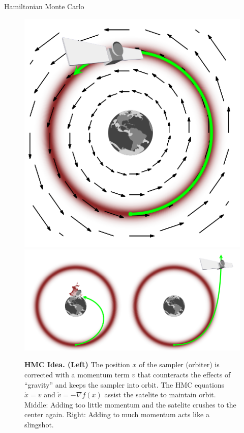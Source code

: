 \documentclass[10pt]{beamer}
\begin{document}
\begin{frame}[allowframebreaks]{Hamiltonian Monte Carlo}
    \begin{figure}
        \centering
        \includegraphics[height=0.4\textheight]{publications/presentations/log_concave_sampling/hmc.png} \quad
        \includegraphics[height=0.4\textheight]{publications/presentations/log_concave_sampling/bad_trajectories.png}
        \caption{\textbf{HMC Idea. (Left)} The position $x$ of the sampler (orbiter) is corrected with a momentum term $v$ that counteracts the effects of ``gravity'' and keeps the sampler into orbit. 
        The HMC equations $\dot x = v$ and $\dot v = -\nabla f(x)$ assist the satelite to maintain orbit. 
        Middle: Adding too little momentum and the satelite crushes to the center again. Right: Adding to much momentum acts like a slingshot.  }
        \label{fig:my_label}
    \end{figure}
    
\end{frame}
    
\end{document}
